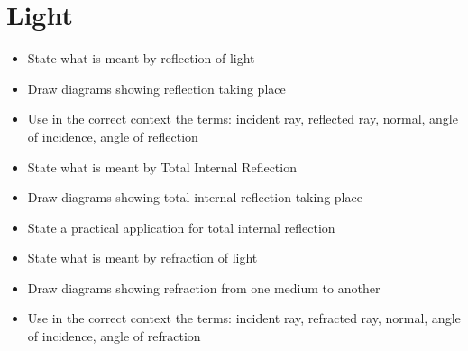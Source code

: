 \section{Light}
\begin{multicols}{2}
	\begin{itemize}
		\item State what is meant by reflection of light 
		\item Draw diagrams showing reflection taking place
		\item Use in the correct context the terms: incident ray, reflected ray, 
			normal, angle of incidence, angle of reflection
		\item State what is meant by Total Internal Reflection
		\item  Draw diagrams showing total internal reflection taking place
		\item State a practical application for total internal reflection
		\item State what is meant by refraction of light
		\item Draw diagrams showing refraction from one medium to another
		\item Use in the correct context the terms: incident ray, refracted ray,
			normal, angle of incidence, angle of refraction
	\end{itemize}
\end{multicols}

